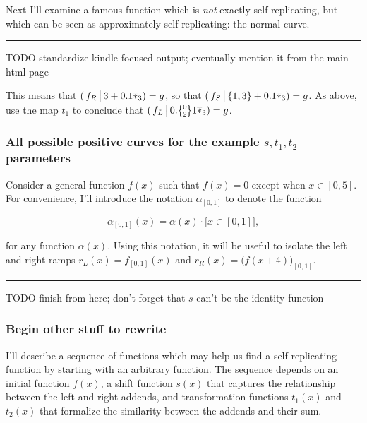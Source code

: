 \documentclass[20pt,]{extarticle}
\begin{document}
Next I'll examine a famous function which is \emph{not} exactly
self-replicating, but which can be seen as approximately
self-replicating: the normal curve.

\begin{center}\rule{0.5\linewidth}{\linethickness}\end{center}

TODO standardize kindle-focused output; eventually mention it from the
main html page

This means that \((\,f_R \,\big|\, 3 + 0.1\overline{*}_3) = g\), so that
\((\,f_S \,\big|\, \{1,3\} + 0.1\overline{*}_3) = g\). As above, use the map
\(t_1\) to conclude that \((\,f_L \restrict 0.\zerotwo 1\lstar) = g\).

\subsubsection{\texorpdfstring{All possible positive curves for the
example \(s,t_1,t_2\)
parameters}{All possible positive curves for the example s,t\_1,t\_2 parameters}}\label{all-possible-positive-curves-for-the-example-stux5f1tux5f2-parameters}

Consider a general function \(f(x)\) such that \(f(x)=0\) except when
\(x \in [0, 5]\). For convenience, I'll introduce the notation
\(\alpha_{[0,1]}\) to denote the function

\[\alpha_{[0,1]}(x) = \alpha(x) \cdot \big[ x\in [0,1] \big],\]

for any function \(\alpha(x)\). Using this notation, it will be useful
to isolate the left and right ramps \(r_L(x) = f_{[0,1]}(x)\) and
\(r_R(x) = \big(f(x + 4)\big)_{[0,1]}\).

\begin{center}\rule{0.5\linewidth}{\linethickness}\end{center}

TODO finish from here; don't forget that \(s\) can't be the identity
function

\subsubsection{Begin other stuff to
rewrite}\label{begin-other-stuff-to-rewrite}

I'll describe a sequence of functions which may help us find a
self-replicating function by starting with an arbitrary function. The
sequence depends on an initial function \(f(x)\), a shift function
\(s(x)\) that captures the relationship between the left and right
addends, and transformation functions \(t_1(x)\) and \(t_2(x)\) that
formalize the similarity between the addends and their sum.
\end{document}
